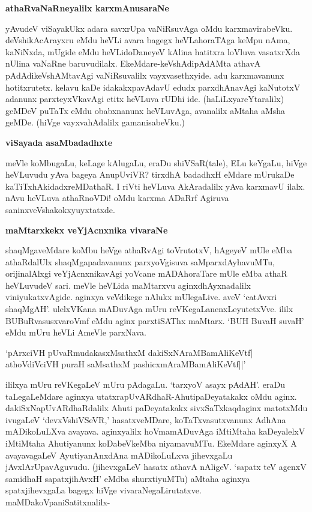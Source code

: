 \noindent
\textbf{athaRvaNaRneyalilx karxmAnusaraNe}\label{page144}

yAvudeV viSayakUkx adara savxrUpa vaNiRsuvAga oMdu karxmavirabeVku. 
deVshikAcArayxru eMdu heVLi avara bagegx heVLahoraTAga keMpu nAma, 
kaNiNxda, mUgide eMdu heVLidoDaneyeV kAlina hatitxra loVluva vasatxrXda nUlina vaNaRne baruvudilalx. EkeMdare-keVshAdipAdAMta athavA pAdAdikeVshAMtavAgi vaNiRsuvalilx vayxvasethxyide. adu karxmavanunx hotitxrutetx. kelavu kaDe idakakxpavAdavU edudx parx\-dhAnavAgi kaNutotxV adanunx parxteyxVkavAgi etitx heVLuva rUDhi ide. (haLiLxyareYtaralilx) geMDeV puTaTx eMdu obabxnanunx heVLuvAga, avanalilx aMtaha aMsha geMDe. (hiVge vayxvahAdalilx gamanisabeVku.)

\noindent
\textbf{viSayada asaMbadadhxte}\label{page115}

meVle koMbugaLu, keLage kAlugaLu, eraDu shiVSaR(tale), ELu keYgaLu, hiVge heVLuvudu yAva bageya AnupUviVR? tirxdhA badadhxH eMdare mUrukaDe kaTiTxhAkidadxreMDathaR. I riVti heVLuva AkAradalilx yAva karxmavU ilalx. nAvu heVLuva athaRnoVDi! oMdu karxma ADaRrf Agiruva saninxveVshakokxyuyxtatxde.

\noindent
\textbf{maMtarxkekx veYjAcnxnika vivaraNe}\label{page115}

shaqMgaveMdare koMbu heVge athaRvAgi toVrutotxV, hAgeyeV mUle eMba athaRdalUlx shaqMgapadavanunx parxyoVgisuva saMparxdAyhavuMTu, orijinalAlxgi veYjAcnxnikavAgi yoVcane mADAhoraTare mUle eMba athaR heVLuvudeV sari. meVle heVLida maMtarxvu aginxdhAyxnadalilx viniyukatxvAgide. aginxya veVdikege nAlukx mUlegaLive. aveV `catAvxri shaqMgAH'. ulelxVKana mADuvAga mUru reVKegaLanenxLeyutetxVve. ililx BUBuRvasusxvaroVmf eMdu aginx parxtiSAThx maMtarx. `BUH BuvaH suvaH' eMdu mUru heVLi AmeVle parxNava.

\begin{shloka}
`pArxciVH pUvaRmudakasxMsathxM dakiSxNAraMBamAliKeVtf|\\\label{115}
athoVdiVciVH puraH saMsathxM pashicxmAraMBamAliKeVtf||'
\end{shloka}

ililxya mUru reVKegaLeV mUru pAdagaLu. `tarxyoV asayx pAdAH'. eraDu 
taLegaLeMdare aginxya utatxrapUvARdhaR-AhutipaDeyatakakx oMdu aginx. dakiSxNapUvARdhaRdalilx Ahuti paDeyatakakx sivxSaTxkaqdaginx matotxMdu ivugaLeV `devxVshiVSeVR,' hasatxveMDare, koTaTxvasutxvanunx AdhAna mADikoLuLXva avayava. aginxyalilx hoVmamADuvAga iMtiMtaha kaDeyalelxV iMtiMtaha Ahutiyanunx koDabeVkeMba niyamavuMTu. EkeMdare aginxyX A avayavagaLeV AyutiyanAnxdAna mADikoLuLxva jihevxgaLu jAvxlArUpavAguvudu. (jihevxgaLeV hasatx athavA nAligeV. `sapatx teV agenxV samidhaH sapatxjihAvxH' eMdba shurxtiyuMTu) aMtaha aginxya spatxjihevxgaLa bagegx hiVge vivaraNegaLirutatxve. maMDakoVpaniSatitxnalilx-

